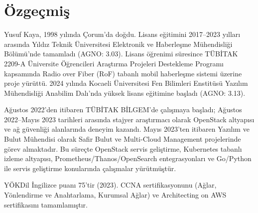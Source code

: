 \chapter*{Özgeçmiş}

Yusuf Kaya, 1998 yılında Çorum'da doğdu.
Lisans eğitimini 2017--2023 yılları arasında Yıldız Teknik Üniversitesi Elektronik ve Haberleşme Mühendisliği Bölümü'nde tamamladı (AGNO: 3.03).
Lisans öğrenimi süresince TÜBİTAK 2209-A Üniversite Öğrencileri Araştırma Projeleri Destekleme Programı kapsamında Radio over Fiber (RoF) tabanlı mobil haberleşme sistemi üzerine proje yürüttü.
2024 yılında Kocaeli Üniversitesi Fen Bilimleri Enstitüsü Yazılım Mühendisliği Anabilim Dalı'nda yüksek lisans eğitimine başladı (AGNO: 3.13).

Ağustos 2022'den itibaren TÜBİTAK BİLGEM'de çalışmaya başladı; Ağustos 2022--Mayıs 2023 tarihleri arasında stajyer araştırmacı olarak OpenStack altyapısı ve ağ güvenliği alanlarında deneyim kazandı.
Mayıs 2023'ten itibaren Yazılım ve Bulut Mühendisi olarak Safir Bulut ve Multi-Cloud Management projelerinde görev almaktadır.
Bu süreçte OpenStack servis geliştirme, Kubernetes tabanlı izleme altyapısı, Prometheus/Thanos/OpenSearch entegrasyonları ve Go/Python ile servis geliştirme konularında çalışmalar yürütmüştür.

YÖKDil İngilizce puanı 75'tir (2023).
CCNA sertifikasyonunu (Ağlar, Yönlendirme ve Anahtarlama, Kurumsal Ağlar) ve Architecting on AWS sertifikasını tamamlamıştır.
